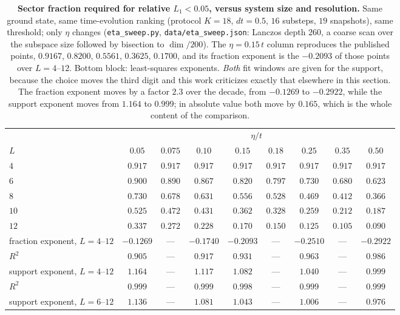\begin{table}[tp]\centering\small
\caption{\textbf{Sector fraction required for relative $L_1<0.05$, versus system size and resolution.}
Same ground state, same time-evolution ranking (protocol $K=18$, $dt=0.5$, $16$ substeps, $19$
snapshots), same threshold; only $\eta$ changes (\texttt{eta\_sweep.py},
\texttt{data/eta\_sweep.json}: Lanczos depth $260$, a coarse scan over the subspace size followed by
bisection to $\dim/200$). The $\eta=0.15\,t$ column reproduces the published points, $0.9167$, $0.8200$, $0.5561$, $0.3625$, $0.1700$, and its
fraction exponent is the $-0.2093$ of those points over $L=4$--$12$. Bottom block: least-squares
exponents. \emph{Both}
fit windows are given for the support, because the choice moves the third digit and this work
criticizes exactly that elsewhere in this section. The fraction exponent moves by a factor $2.3$ over
the decade, from $-0.1269$ to $-0.2922$, while the support exponent moves from $1.164$ to $0.999$; in
absolute value both move by $0.165$, which is the whole content of the
comparison.}\label{tab:fracgrid}
\begin{tabular}{lcccccccc}
\toprule
 & \multicolumn{8}{c}{$\eta/t$}\\
\cmidrule(lr){2-9}
$L$ & $0.05$ & $0.075$ & $0.10$ & $0.15$ & $0.18$ & $0.25$ & $0.35$ & $0.50$\\
\midrule
$4$   & $0.917$ & $0.917$ & $0.917$ & $0.917$ & $0.917$ & $0.917$ & $0.917$ & $0.917$\\
$6$   & $0.900$ & $0.890$ & $0.867$ & $0.820$ & $0.797$ & $0.730$ & $0.680$ & $0.623$\\
$8$   & $0.730$ & $0.678$ & $0.631$ & $0.556$ & $0.528$ & $0.469$ & $0.412$ & $0.366$\\
$10$  & $0.525$ & $0.472$ & $0.431$ & $0.362$ & $0.328$ & $0.259$ & $0.212$ & $0.187$\\
$12$  & $0.337$ & $0.272$ & $0.228$ & $0.170$ & $0.150$ & $0.125$ & $0.105$ & $0.090$\\
\midrule
fraction exponent, $L{=}4$--$12$ & $-0.1269$ & --- & $-0.1740$ & $-0.2093$ & --- & $-0.2510$ & --- & $-0.2922$\\
$R^{2}$                          & $0.905$ & --- & $0.917$ & $0.931$ & --- & $0.963$ & --- & $0.986$\\
support exponent, $L{=}4$--$12$  & $1.164$ & --- & $1.117$ & $1.082$ & --- & $1.040$ & --- & $0.999$\\
$R^{2}$                          & $0.999$ & --- & $0.999$ & $0.998$ & --- & $0.999$ & --- & $0.999$\\
support exponent, $L{=}6$--$12$  & $1.136$ & --- & $1.081$ & $1.043$ & --- & $1.006$ & --- & $0.976$\\
\bottomrule
\end{tabular}
\end{table}

